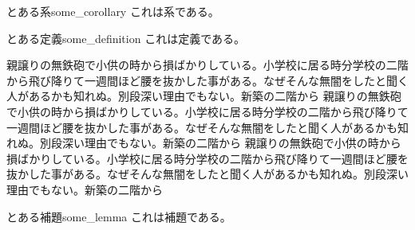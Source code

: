 \begin{corollary}{とある系}{some_corollary}
    これは系である。
\end{corollary}

\begin{definition}{とある定義}{some_definition}
    これは定義である。
\end{definition}
親譲りの無鉄砲で小供の時から損ばかりしている。小学校に居る時分学校の二階から飛び降りて一週間ほど腰を抜かした事がある。なぜそんな無闇をしたと聞く人があるかも知れぬ。別段深い理由でもない。新築の二階から
親譲りの無鉄砲で小供の時から損ばかりしている。小学校に居る時分学校の二階から飛び降りて一週間ほど腰を抜かした事がある。なぜそんな無闇をしたと聞く人があるかも知れぬ。別段深い理由でもない。新築の二階から
親譲りの無鉄砲で小供の時から損ばかりしている。小学校に居る時分学校の二階から飛び降りて一週間ほど腰を抜かした事がある。なぜそんな無闇をしたと聞く人があるかも知れぬ。別段深い理由でもない。新築の二階から

\begin{lemma}{とある補題}{some_lemma}
    これは補題である。
\end{lemma}